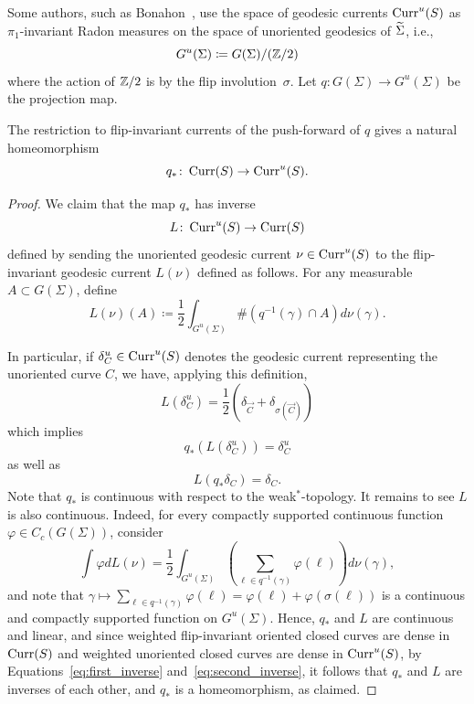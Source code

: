 Some authors, such as
Bonahon~\cite{Bonahon86:EndsHyperbolicManifolds,Bonahon88:GeodesicCurrent}, use the space of geodesic currents $\operatorname{Curr}^u(S)$ as
$\pi_1$-invariant
Radon measures on the space of unoriented geodesics of
  $\widetilde{\Sigma}$, i.e.,
\[
G^u(\Sigma) \coloneqq G(\Sigma)/(\mathbb{Z}/2)
\]
where the action of $\mathbb{Z}/2$ is by the flip involution~$\sigma$. Let
$q \colon G(\Sigma) \to G^u(\Sigma)$ be the projection map.

\begin{lemma}
\label{lem:unoriented_flipinvariant}
The restriction to  flip-invariant currents of the push-forward of $q$ gives a natural homeomorphism
\begin{equation}
q_* \colon \operatorname{Curr}(S) \to \operatorname{Curr}^u(S).
\label{eq:unoriented_flipinvariant}
\end{equation}
\end{lemma}
\begin{proof}
We claim that the map $q_*$ has inverse
\[
L \colon \operatorname{Curr}^u(S) \to \operatorname{Curr}(S)
\]
defined by sending the unoriented geodesic current $\nu \in \operatorname{Curr}^u(S)$ to the flip-invariant geodesic current $L(\nu)$ defined as follows. For any measurable $A \subset G(\Sigma)$, define
\[
L(\nu)(A) \coloneqq \frac12 \int_{G^u(\Sigma)} \# (q^{-1}(\gamma) \cap A) d\nu(\gamma).
\]

In particular, if $\delta_C^u \in \operatorname{Curr}^u(S)$ denotes the geodesic current representing the unoriented curve $C$, we have, applying this definition,
\[
L(\delta_C^u) = \frac12 \left(\delta_{\vec C} + \delta_{\sigma(\vec C)} \right)
\]
which implies
\begin{equation}
q_* (L(\delta_C^u)) = \delta_C^u
\label{eq:first_inverse}
\end{equation}
as well as
\begin{equation}
L\left(q_* \delta_C \right) =\delta_C.
\label{eq:second_inverse}
\end{equation}
Note that $q_*$ is continuous with respect to the weak$^*$-topology.
It remains to see $L$ is also continuous. Indeed, for every compactly supported continuous function $\varphi \in C_c(G(\Sigma))$, consider
\[
\int \varphi dL(\nu) = \frac12 \int_{G^u(\Sigma)} \left(\sum_{\ell \in q^{-1}(\gamma)} \varphi(\ell)\right)d\nu(\gamma),
\]
and note that $\gamma \mapsto \sum_{\ell \in q^{-1}(\gamma)} \varphi(\ell)=\varphi(\ell) + \varphi(\sigma(\ell))$ is a continuous and compactly supported function on $G^u(\Sigma)$.
Hence, $q_*$ and $L$ are continuous and linear, and since weighted flip-invariant oriented closed curves are dense in $\operatorname{Curr}(S)$ and weighted unoriented closed curves are dense in $\operatorname{Curr}^u(S)$, by Equations~\ref{eq:first_inverse} and~\ref{eq:second_inverse}, it follows that $q_*$ and $L$ are inverses of each other, and $q_*$ is a homeomorphism, as claimed.
\end{proof}
